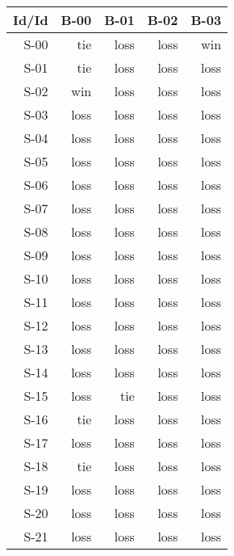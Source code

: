 \begin{tabular}{ | r | r | r | r | r | }
    \hline
        Id/Id  &   B-00  &   B-01  &   B-02  &   B-03  \\
    \hline
    \hline
         S-00  &    tie  &   loss  &   loss  &    win  \\
    \hline
         S-01  &    tie  &   loss  &   loss  &   loss  \\
    \hline
         S-02  &    win  &   loss  &   loss  &   loss  \\
    \hline
         S-03  &   loss  &   loss  &   loss  &   loss  \\
    \hline
         S-04  &   loss  &   loss  &   loss  &   loss  \\
    \hline
         S-05  &   loss  &   loss  &   loss  &   loss  \\
    \hline
         S-06  &   loss  &   loss  &   loss  &   loss  \\
    \hline
         S-07  &   loss  &   loss  &   loss  &   loss  \\
    \hline
         S-08  &   loss  &   loss  &   loss  &   loss  \\
    \hline
         S-09  &   loss  &   loss  &   loss  &   loss  \\
    \hline
         S-10  &   loss  &   loss  &   loss  &   loss  \\
    \hline
         S-11  &   loss  &   loss  &   loss  &   loss  \\
    \hline
         S-12  &   loss  &   loss  &   loss  &   loss  \\
    \hline
         S-13  &   loss  &   loss  &   loss  &   loss  \\
    \hline
         S-14  &   loss  &   loss  &   loss  &   loss  \\
    \hline
         S-15  &   loss  &    tie  &   loss  &   loss  \\
    \hline
         S-16  &    tie  &   loss  &   loss  &   loss  \\
    \hline
         S-17  &   loss  &   loss  &   loss  &   loss  \\
    \hline
         S-18  &    tie  &   loss  &   loss  &   loss  \\
    \hline
         S-19  &   loss  &   loss  &   loss  &   loss  \\
    \hline
         S-20  &   loss  &   loss  &   loss  &   loss  \\
    \hline
         S-21  &   loss  &   loss  &   loss  &   loss  \\

\end{tabular}
